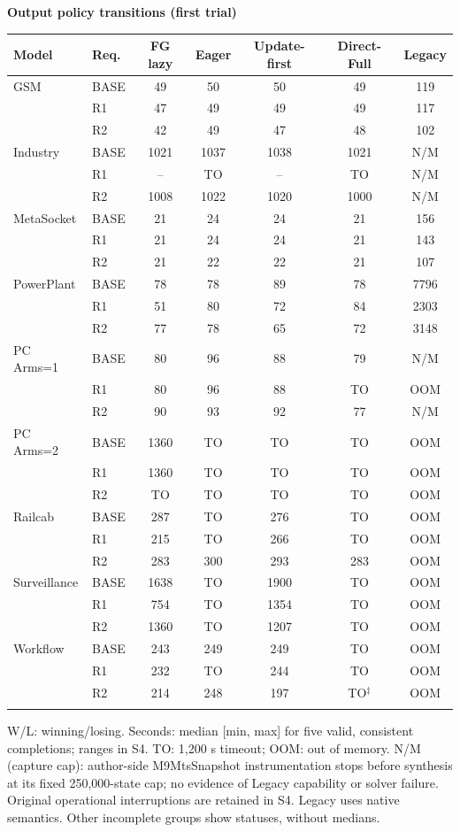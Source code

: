\clearpage\noindent\textbf{Output policy transitions (first trial)}\par\smallskip
\begingroup\scriptsize\setlength{\tabcolsep}{3pt}
\begin{tabular}{@{}llccccc@{}}
\toprule
Model & Req. & FG lazy & Eager & Update-first & Direct-Full & Legacy\\
\midrule
GSM & BASE & 49 & 50 & 50 & 49 & 119\\
 & R1 & 47 & 49 & 49 & 49 & 117\\
 & R2 & 42 & 49 & 47 & 48 & 102\\
\addlinespace[2pt]
Industry & BASE & 1021 & 1037 & 1038 & 1021 & N/M\\
 & R1 & -- & TO & -- & TO & N/M\\
 & R2 & 1008 & 1022 & 1020 & 1000 & N/M\\
\addlinespace[2pt]
MetaSocket & BASE & 21 & 24 & 24 & 21 & 156\\
 & R1 & 21 & 24 & 24 & 21 & 143\\
 & R2 & 21 & 22 & 22 & 21 & 107\\
\addlinespace[2pt]
PowerPlant & BASE & 78 & 78 & 89 & 78 & 7796\\
 & R1 & 51 & 80 & 72 & 84 & 2303\\
 & R2 & 77 & 78 & 65 & 72 & 3148\\
\addlinespace[2pt]
PC Arms=1 & BASE & 80 & 96 & 88 & 79 & N/M\\
 & R1 & 80 & 96 & 88 & TO & OOM\\
 & R2 & 90 & 93 & 92 & 77 & N/M\\
\addlinespace[2pt]
PC Arms=2 & BASE & 1360 & TO & TO & TO & OOM\\
 & R1 & 1360 & TO & TO & TO & OOM\\
 & R2 & TO & TO & TO & TO & OOM\\
\addlinespace[2pt]
Railcab & BASE & 287 & TO & 276 & TO & OOM\\
 & R1 & 215 & TO & 266 & TO & OOM\\
 & R2 & 283 & 300 & 293 & 283 & OOM\\
\addlinespace[2pt]
Surveillance & BASE & 1638 & TO & 1900 & TO & OOM\\
 & R1 & 754 & TO & 1354 & TO & OOM\\
 & R2 & 1360 & TO & 1207 & TO & OOM\\
\addlinespace[2pt]
Workflow & BASE & 243 & 249 & 249 & TO & OOM\\
 & R1 & 232 & TO & 244 & TO & OOM\\
 & R2 & 214 & 248 & 197 & TO$^{\ddagger}$ & OOM\\
\addlinespace[2pt]
\bottomrule
\end{tabular}\endgroup

\par{\scriptsize W/L: winning/losing. Seconds: median [min, max] for five valid, consistent completions; ranges in S4. TO: 1,200 s timeout; OOM: out of memory. N/M (capture cap): author-side M9MtsSnapshot instrumentation stops before synthesis at its fixed 250,000-state cap; no evidence of Legacy capability or solver failure. Original operational interruptions are retained in S4. Legacy uses native semantics. Other incomplete groups show statuses, without medians.}
